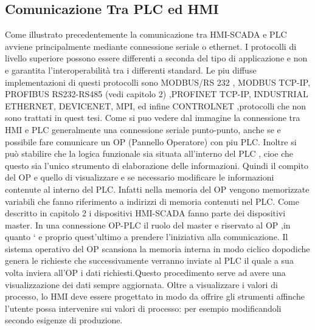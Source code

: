 \documentclass[12pt, a4paper, oneside]{book}
\begin{document}
\subsection{Comunicazione Tra PLC ed HMI} Come illustrato precedentemente la comunicazione tra HMI-SCADA e PLC avviene principalmente mediante connessione seriale o ethernet. I protocolli di livello superiore possono essere differenti a seconda del tipo di applicazione e non e garantita l’interoperabilità tra i differenti standard. Le piu diffuse implementazioni di questi protocolli sono MODBUS/RS 232 , MODBUS TCP-IP, PROFIBUS RS232-RS485 (vedi capitolo 2) ,PROFINET TCP-IP, INDUSTRIAL ETHERNET, DEVICENET, MPI, ed infine CONTROLNET ,protocolli che non sono trattati in quest tesi.
Come si puo vedere dal immagine  la connessione tra HMI e PLC generalmente una connessione seriale punto-punto, anche se e possibile fare comunicare un OP (Pannello Operatore) con piu PLC. Inoltre si può stabilire che la logica funzionale sia situata all’interno del PLC , cioe che questo sia l’unico strumento di elaborazione delle informazioni. Quindi il compito del OP e quello di visualizzare e se necessario modificare le informazioni contenute al interno del PLC. Infatti nella memoria del OP vengono memorizzate variabili che fanno riferimento a indirizzi di memoria contenuti nel PLC. Come descritto in capitolo 2 i dispositivi HMI-SCADA fanno parte dei dispositivi master. In una connessione OP-PLC il ruolo del master e riservato al OP ,in quanto ` e proprio quest’ultimo a prendere l’iniziativa alla comunicazione. Il sistema operativo del OP scansiona la memoria interna in modo ciclico dopodiche genera le richieste che successivamente verranno inviate al PLC il quale a sua volta inviera all’OP i dati richiesti.Questo procedimento serve ad avere una visualizzazione dei dati sempre aggiornata. Oltre
a visualizzare i valori di processo, lo HMI deve essere progettato in modo da offrire gli strumenti affinche l’utente possa intervenire sui valori di processo: per esempio modificandoli secondo esigenze di produzione.
\end{document}

